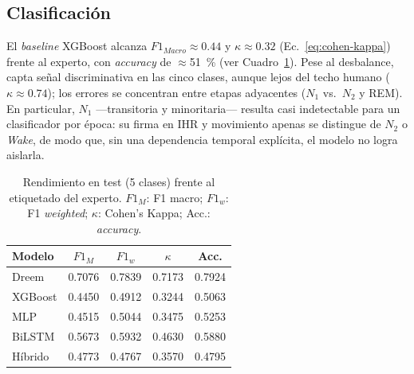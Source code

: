 \documentclass[conference]{IEEEtran}
\begin{document}
\subsection{Clasificación}

El \emph{baseline} XGBoost alcanza $F1_{Macro}\approx0.44$ y $\kappa\approx0.32$
(Ec.~\eqref{eq:cohen-kappa}) frente al experto, con \textit{accuracy} de $\approx$\qty{51}{\percent} (ver Cuadro~\ref{tab:resultados}). Pese al desbalance, capta señal discriminativa en las cinco clases, aunque lejos del techo humano ($\kappa\approx0.74$); los errores se concentran entre etapas adyacentes ($N_1$ vs.\ $N_2$ y REM). En particular, $N_1$ ---transitoria y minoritaria--- resulta casi indetectable para un clasificador por época: su firma en IHR y movimiento apenas se distingue de $N_2$ o \textit{Wake}, de modo que, sin una dependencia temporal explícita, el modelo no logra aislarla.
\vspace{-10pt}
\begin{table}[!ht]
\caption{Rendimiento en test (5 clases) frente al etiquetado del experto. $F1_{M}$: F1 macro; $F1_{w}$: F1 \emph{weighted}; $\kappa$: Cohen's Kappa; Acc.: \emph{accuracy}.}
\label{tab:resultados}
\centering
\begin{tabular}{lcccc}
\hline
\textbf{Modelo} & \textbf{$F1_{M}$} & \textbf{$F1_{w}$} & \textbf{$\kappa$} & \textbf{Acc.} \\
\hline
Dreem & 0.7076 & 0.7839 & 0.7173 & 0.7924 \\
XGBoost & 0.4450 & 0.4912 & 0.3244 & 0.5063 \\
MLP & 0.4515 & 0.5044 & 0.3475 & 0.5253 \\
BiLSTM & 0.5673 & 0.5932 & 0.4630 & 0.5880 \\
Híbrido & 0.4773 & 0.4767 & 0.3570 & 0.4795 \\
\hline
\end{tabular}
\end{table}
\end{document}
